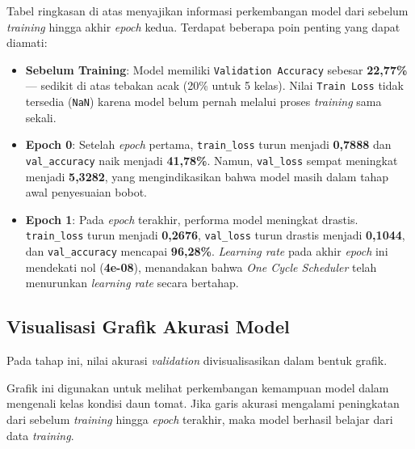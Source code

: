Tabel ringkasan di atas menyajikan informasi perkembangan model dari sebelum \textit{training} hingga akhir \textit{epoch} kedua. Terdapat beberapa poin penting yang dapat diamati:

\begin{itemize}
    \item \textbf{Sebelum Training}: Model memiliki \texttt{Validation Accuracy} sebesar \textbf{22,77\%} --- sedikit di atas tebakan acak (20\% untuk 5 kelas). Nilai \texttt{Train Loss} tidak tersedia (\texttt{NaN}) karena model belum pernah melalui proses \textit{training} sama sekali.
    \item \textbf{Epoch 0}: Setelah \textit{epoch} pertama, \texttt{train\_loss} turun menjadi \textbf{0,7888} dan \texttt{val\_accuracy} naik menjadi \textbf{41,78\%}. Namun, \texttt{val\_loss} sempat meningkat menjadi \textbf{5,3282}, yang mengindikasikan bahwa model masih dalam tahap awal penyesuaian bobot.
    \item \textbf{Epoch 1}: Pada \textit{epoch} terakhir, performa model meningkat drastis. \texttt{train\_loss} turun menjadi \textbf{0,2676}, \texttt{val\_loss} turun drastis menjadi \textbf{0,1044}, dan \texttt{val\_accuracy} mencapai \textbf{96,28\%}. \textit{Learning rate} pada akhir \textit{epoch} ini mendekati nol (\textbf{4e-08}), menandakan bahwa \textit{One Cycle Scheduler} telah menurunkan \textit{learning rate} secara bertahap.
\end{itemize}

\subsection{Visualisasi Grafik Akurasi Model}

Pada tahap ini, nilai akurasi \textit{validation} divisualisasikan dalam bentuk grafik.

Grafik ini digunakan untuk melihat perkembangan kemampuan model dalam mengenali kelas kondisi daun tomat. Jika garis akurasi mengalami peningkatan dari sebelum \textit{training} hingga \textit{epoch} terakhir, maka model berhasil belajar dari data \textit{training}.

